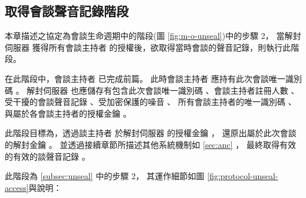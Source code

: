 \subsection{取得會談聲音記錄階段}\label{subsec:protocol-unseal-access}

    本章描述之協定為會談生命週期中的階段(圖 \ref{fig:m-o-unseal})中的步驟 2，
當解封伺服器 \DEFserver 獲得所有會談主持者 \DEFownerAll 的授權後，欲取得當時會談的聲音記錄，則執行此階段。

    在此階段中，會談主持者 \DEFowner 已完成前篇。
此時會談主持者 \DEFowner 應持有此次會談唯一識別碼 \DEFsessionID。
解封伺服器 \DEFserver 也應儲存有包含此次會談唯一識別碼 \DEFsessionID、會談主持者註冊人數 \DEFowreg、
受干擾的會談聲音記錄 \DEFrecJ、受加密保護的噪音 \DEFrecP、
所有會談主持者的唯一識別碼 \DEFownerID、與屬於各會談主持者的授權金鑰 \DEFagentKey。

    此階段目標為，透過談主持者 \DEFowner 於解封伺服器 \DEFserver 的授權金鑰 \DEFagentKey，
還原出屬於此次會談的解封金鑰 \DEFunsealKey。
並透過接續章節所描述其他系統機制如 \ref{sec:anc} ，
最終取得有效的有效的談聲音記錄 \DEFrecREV。

    此階段為 \ref{subsec:unseal} 中的步驟 2，
其運作細節如圖 \ref{fig:protocol-unseal-access}與說明：

